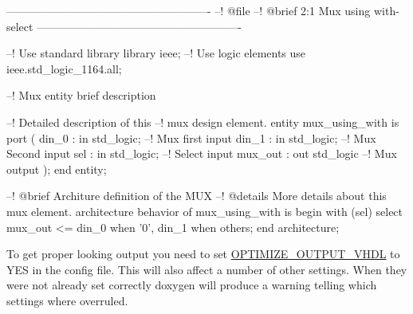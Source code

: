 \begin{DoxyCodeInclude}
-------------------------------------------------------
--! @file
--! @brief 2:1 Mux using with-select
-------------------------------------------------------

--! Use standard library
library ieee;
--! Use logic elements
    use ieee.std_logic_1164.all;

--! Mux entity brief description

--! Detailed description of this 
--! mux design element.
entity mux_using_with is
    port (
        din_0   : in  std_logic; --! Mux first input
        din_1   : in  std_logic; --! Mux Second input
        sel     : in  std_logic; --! Select input
        mux_out : out std_logic  --! Mux output
    );
end entity;

--! @brief Architure definition of the MUX
--! @details More details about this mux element.
architecture behavior of mux_using_with is
begin
    with (sel) select
    mux_out <= din_0 when '0',
               din_1 when others;
end architecture;

\end{DoxyCodeInclude}
 

To get proper looking output you need to set \hyperlink{config_cfg_optimize_output_vhdl}{OPTIMIZE\_\-OUTPUT\_\-VHDL} to {\ttfamily YES} in the config file. This will also affect a number of other settings. When they were not already set correctly doxygen will produce a warning telling which settings where overruled. 